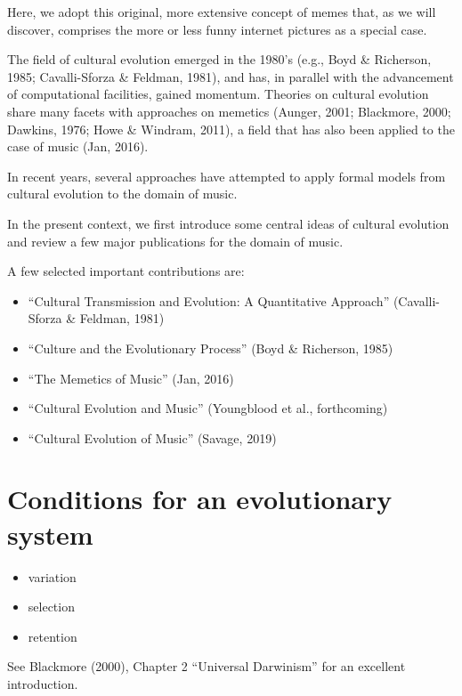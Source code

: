 \documentclass[
  a4paperpaper,
  ,captions=tableheading
]{scrbook}
\providecommand{\tightlist}{%
  \setlength{\itemsep}{0pt}\setlength{\parskip}{0pt}}
\begin{document}
Here, we adopt this original, more extensive concept of memes that, as
we will discover, comprises the more or less funny internet pictures as
a special case.

The field of cultural evolution emerged in the 1980's (e.g., Boyd \&
Richerson, 1985; Cavalli-Sforza \& Feldman, 1981), and has, in parallel
with the advancement of computational facilities, gained momentum.
Theories on cultural evolution share many facets with approaches on
memetics (Aunger, 2001; Blackmore, 2000; Dawkins, 1976; Howe \& Windram,
2011), a field that has also been applied to the case of music (Jan,
2016).

In recent years, several approaches have attempted to apply formal
models from cultural evolution to the domain of music.

In the present context, we first introduce some central ideas of
cultural evolution and review a few major publications for the domain of
music.

A few selected important contributions are:

\begin{itemize}
\tightlist
\item
  ``Cultural Transmission and Evolution: A Quantitative Approach''
  (Cavalli-Sforza \& Feldman, 1981)
\item
  ``Culture and the Evolutionary Process'' (Boyd \& Richerson, 1985)
\item
  ``The Memetics of Music'' (Jan, 2016)
\item
  ``Cultural Evolution and Music'' (Youngblood et al., forthcoming)
\item
  ``Cultural Evolution of Music'' (Savage, 2019)
\end{itemize}

\hypertarget{conditions-for-an-evolutionary-system}{%
\section{Conditions for an evolutionary
system}\label{conditions-for-an-evolutionary-system}}

\begin{itemize}
\tightlist
\item
  variation
\item
  selection
\item
  retention
\end{itemize}

See Blackmore (2000), Chapter 2 ``Universal Darwinism'' for an excellent
introduction.
\end{document}
